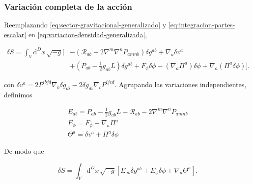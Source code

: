 \documentclass{beamer}
\newcommand{\Rcal}{\mathcal{R}}
\renewcommand{\dd}{\mathrm{d}}
\newcommand{\Eq}[1]{\eqref{#1}}
\begin{document}
\begin{frame}[label=nav-frame-077]
\frametitle{Variación completa de la acción}
\scriptsize

Reemplazando \Eq{eq:sector-gravitacional-generalizado} y
\Eq{eq:integracion-partes-escalar} en
\Eq{eq:variacion-densidad-generalizada},

\[
\begin{aligned}
\delta S
=
\int_V\dd^Dx\,\sqrt{-g}\Big[
&
-\left(
\Rcal_{ab}
+
2\nabla^m\nabla^nP_{amnb}
\right)\delta g^{ab}
+
\nabla_a\delta v^a
\\
&+
\left(
P_{ab}-\frac12g_{ab}L
\right)\delta g^{ab}
+
F_\phi\delta\phi
-
(\nabla_a\Pi^a)\delta\phi
+
\nabla_a(\Pi^a\delta\phi)
\Big].
\end{aligned}
\]


con $\delta v^a = 2P^{ibjd}\nabla_b\delta g_{di} - 2\delta g_{di}\nabla_cP^{ijcd}$. Agrupando las variaciones independientes, definimos

\begin{align}
\boxed{
E_{ab}
=
P_{ab}
-\frac12g_{ab}L
-\Rcal_{ab}
-2\nabla^m\nabla^nP_{amnb}
}
\label{eq:Eab-generalizado}
\\[1mm]
\boxed{
E_\phi
=
F_\phi-\nabla_a\Pi^a
}
\label{eq:Ephi-generalizado}
\\[1mm]
\boxed{
\Theta^a
=
\delta v^a+\Pi^a\delta\phi
}
\label{eq:theta-generalizado}
\end{align}


De modo que

\begin{equation}
\boxed{
\delta S
=
\int_V\dd^Dx\,\sqrt{-g}
\left[
E_{ab}\delta g^{ab}
+
E_\phi\delta\phi
+
\nabla_a\Theta^a
\right].
}
\label{eq:variacion-accion-generalizada-final}
\end{equation}

\end{frame}
\end{document}
